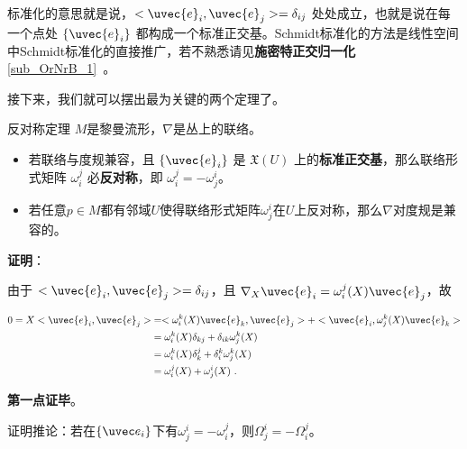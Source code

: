 标准化的意思就是说，$<\uvec{e}_i, \uvec{e}_j>=\delta_{ij}$ 处处成立，也就是说在每一个点处 $\{\uvec{e}_i\}$ 都构成一个标准正交基。Schmidt标准化的方法是线性空间中Schmidt标准化的直接推广，若不熟悉请见\textbf{施密特正交归一化}\autoref{sub_OrNrB_1}~。

接下来，我们就可以摆出最为关键的两个定理了。

\begin{theorem}{反对称定理}\label{the_ConFom_1}
$M$是黎曼流形，$\nabla$是丛上的联络。
\begin{itemize}
\item 若联络与度规兼容，且 $\{\uvec{e}_i\}$ 是 $\mathfrak{X}(U)$ 上的\textbf{标准正交基}，那么联络形式矩阵 $\omega^j_i$ 必\textbf{反对称}，即 $\omega^j_i=-\omega^i_j$。
\item 若任意$p\in M$都有邻域$U$使得联络形式矩阵$\omega^i_j$在$U$上反对称，那么$\nabla$对度规是兼容的。
\end{itemize}
\end{theorem}

\textbf{证明}：

由于 $<\uvec{e}_i, \uvec{e}_j>=\delta_{ij}$，且 $\nabla_X\uvec{e}_i=\omega^j_i(X)\uvec{e}_j$，故

\begin{equation}
\begin{aligned}
0=X<\uvec{e}_i, \uvec{e}_j>&=<\omega^k_i(X)\uvec{e}_k, \uvec{e}_j>+<\uvec{e}_i, \omega^k_j(X)\uvec{e}_k>\\
&=\omega^k_i(X)\delta_{kj}+\delta_{ik}\omega^k_j(X)\\
&=\omega^k_i(X)\delta_{k}^j+\delta_{i}^k\omega^k_j(X)\\
&=\omega^j_i(X)+\omega^i_j(X)~.
\end{aligned}
\end{equation}

\textbf{第一点证毕}。
\begin{exercise}{}
证明推论：若在$\{\uvec e_i\}$下有$\omega^i_j=-\omega^j_i$，则$\Omega^i_j=-\Omega^j_i$。
\end{exercise}

